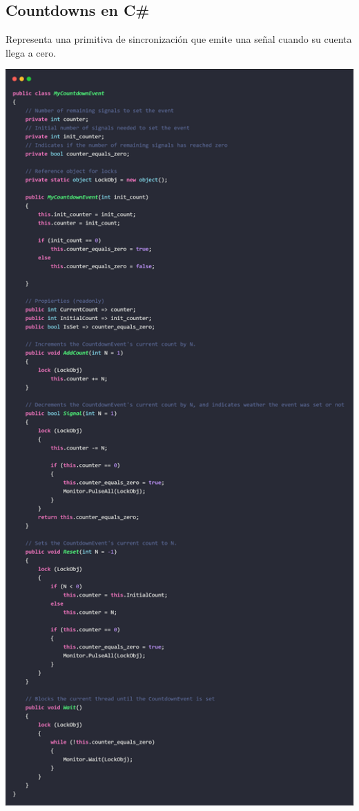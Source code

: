 \documentclass[10pt]{article} %
\begin{document}
\subsection{Countdowns en C\#}

Representa una primitiva de sincronización que emite una señal cuando su cuenta llega a cero.

\begin{center}
	\includegraphics[width=15cm]{MyCountdownEvent.jpg}
\end{center}
\end{document}
